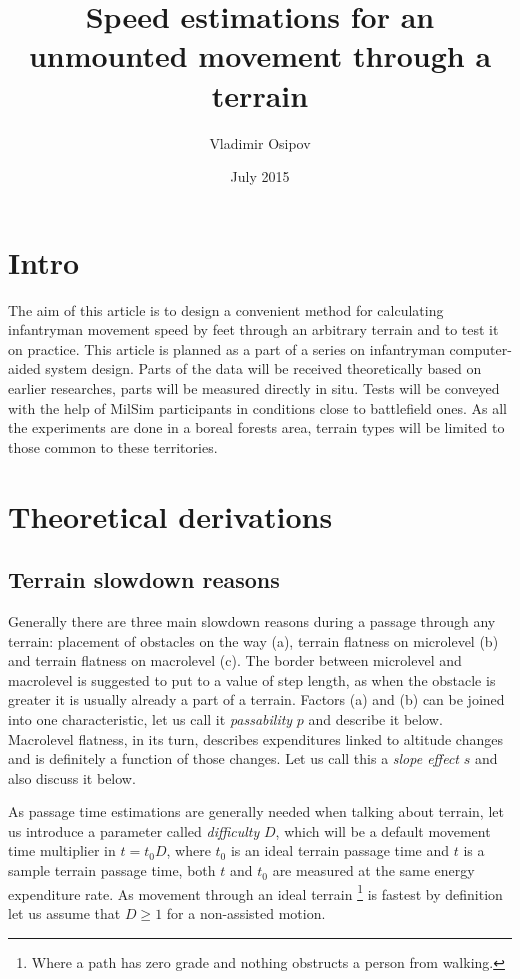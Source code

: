 \documentclass[12pt]{article}
\begin{document}
\title{Speed estimations for an unmounted movement through a terrain}
\author{Vladimir Osipov}
\date{July 2015}
\maketitle

\section{Intro}

The aim of this article is to design a convenient method for calculating infantryman movement speed by feet through an arbitrary terrain and to test it on practice. This article is planned as a part of a series on infantryman computer-aided system design. Parts of the data will be received theoretically based on earlier researches, parts will be measured directly in situ. Tests will be conveyed with the help of MilSim participants in conditions close to battlefield ones. As all the experiments are done in a boreal forests area, terrain types will be limited to those common to these territories.

\newpage

\section{Theoretical derivations}

\subsection{Terrain slowdown reasons}

Generally there are three main slowdown reasons during a passage through any terrain: placement of obstacles on the way (a), terrain flatness on microlevel (b) and terrain flatness on macrolevel (c). The border between microlevel and macrolevel is suggested to put to a value of step length, as when the obstacle is greater it is usually already a part of a terrain. Factors (a) and (b) can be joined into one characteristic, let us call it \textit{passability} $p$ and describe it below. Macrolevel flatness, in its turn, describes expenditures linked to altitude changes and is definitely a function of those changes. Let us call this a \textit{slope effect} $s$ and also discuss it below.

As passage time estimations are generally needed when talking about terrain, let us introduce a parameter called \textit{difficulty} $D$, which will be a default movement time multiplier in $t=t_{0}D$, where $t_{0}$ is an ideal terrain passage time and $t$ is a sample terrain passage time, both $t$ and $t_{0}$ are measured at the same energy expenditure rate. As movement through an ideal terrain \footnote{Where a path has zero grade and nothing obstructs a person from walking.} is fastest by definition let us assume that $D\geq1$ for a non-assisted motion.
\end{document}
